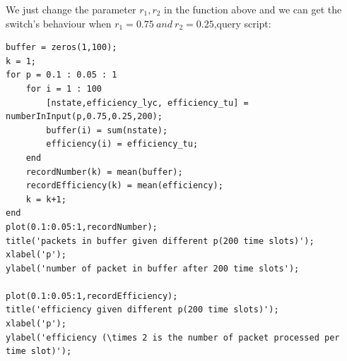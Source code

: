 \documentclass[twoside]{article}
\begin{document}
\newpage
\begin{multicols*}{2}
We just change the parameter $r_1,r_2$ in the function above and we can get the switch's behaviour when $r_1 = 0.75 ~and~ r_2 = 0.25$,query script:\\
\begin{lstlisting}
buffer = zeros(1,100);
k = 1;
for p = 0.1 : 0.05 : 1
    for i = 1 : 100
        [nstate,efficiency_lyc, efficiency_tu] = numberInInput(p,0.75,0.25,200);
        buffer(i) = sum(nstate);
        efficiency(i) = efficiency_tu;
    end
    recordNumber(k) = mean(buffer);
    recordEfficiency(k) = mean(efficiency);
    k = k+1;
end
plot(0.1:0.05:1,recordNumber);
title('packets in buffer given different p(200 time slots)');
xlabel('p');
ylabel('number of packet in buffer after 200 time slots');

plot(0.1:0.05:1,recordEfficiency);
title('efficiency given different p(200 time slots)');
xlabel('p');
ylabel('efficiency (\times 2 is the number of packet processed per time slot)');


\end{lstlisting}
\end{multicols*}
\end{document}
